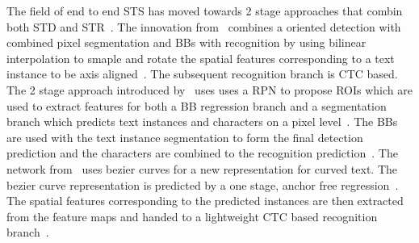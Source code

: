 The field of end to end \ac{STS} has moved towards 2 stage approaches that combin both \ac{STD}
and \ac{STR}~\citep{lyu_mask_2018,long_scene_2021}.
The innovation from~\cite{liu_fots_2018} combines a oriented detection with combined pixel
segmentation and \acp{BB} with recognition by using bilinear interpolation to smaple and rotate
the spatial features corresponding to a text instance to be axis aligned~\citep{liu_fots_2018}.
The subsequent recognition branch is \ac{CTC} based.
The 2 stage approach introduced by~\cite{lyu_mask_2018} uses uses a \ac{RPN} to propose \acp{ROI}
which are used to extract features for both a \ac{BB} regression branch and a segmentation branch
which predicts text instances and characters on a pixel level~\citep{lyu_mask_2018}.
The \acp{BB} are used with the text instance segmentation to form the final detection prediction and
the characters are combined to the recognition prediction~\citep{lyu_mask_2018}.
The network from~\cite{liu_abcnet_2020} uses bezier curves for a new representation for curved text.
The bezier curve representation is predicted by a one stage, anchor free
regression~\citep{liu_abcnet_2020}.
The spatial features corresponding to the predicted instances are then extracted from the feature
maps and handed to a lightweight \ac{CTC} based recognition branch~\citep{lyu_mask_2018}.
